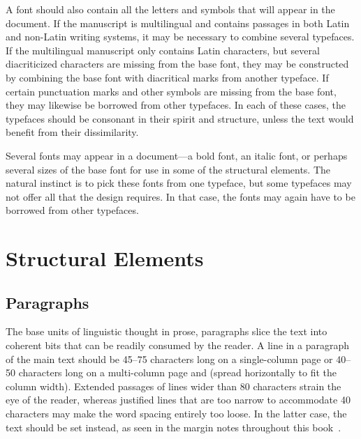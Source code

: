 A font should also contain all the letters and symbols that will appear in
the document. If the manuscript is multilingual and contains passages in both
Latin and non-Latin writing systems, it may be necessary to combine several
typefaces. If the multilingual manuscript only contains Latin characters, but
several diacriticized characters are missing from the base font, they may be
constructed by combining the base font with diacritical marks from another
typeface. If certain punctuation marks and other symbols are missing from the
base font, they may likewise be borrowed from other typefaces. In each of these
cases, the typefaces should be consonant in their spirit and structure, unless
the text would benefit from their dissimilarity.

Several fonts may appear in a document---a bold font, an italic font, or perhaps
several sizes of the base font for use in some of the structural elements. The
natural instinct is to pick these fonts from one typeface, but some typefaces
may not offer all that the design requires. In that case, the fonts may again
have to be borrowed from other typefaces.


\section{Structural Elements}
\subsection{Paragraphs}
The base units of linguistic thought in prose, paragraphs slice the text into
coherent bits that can be readily consumed by the reader. A line in a paragraph
of the main text should be 45--75 characters long on a single-column page or
40--50 characters long on a multi-column page and  (spread
horizontally to fit the column width). Extended passages of lines wider than 80
characters strain the eye of the reader, whereas justified lines that are too
narrow to accommodate 40 characters may make the word spacing entirely too
loose. In the latter case, the text should be set  instead, as seen
in the margin notes throughout this book~\cite[sec.\,2.1.2]{bringhurst92}.

